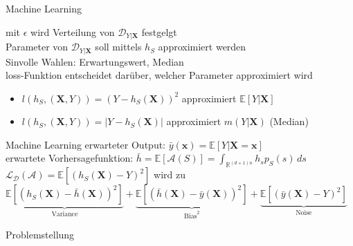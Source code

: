 \documentclass[17pt, fleqn]{beamer}
\begin{document}
\begin{frame}{Machine Learning}
    \small{
        mit $ \epsilon $ wird Verteilung von $ \mathcal{D}_{Y|\mathbf{X}} $ festgelgt \\ [0.2cm]
        Parameter von $ \mathcal{D}_{Y|\mathbf{X}} $ soll mittels $ h_S $ approximiert werden \\ [0.2cm]
        Sinvolle Wahlen: Erwartungswert, Median \\ [0.2cm]
        loss-Funktion entscheidet darüber, welcher Parameter approximiert wird
        \begin{itemize}
            \item $l(h_S, (\mathbf{X}, Y)) = (Y - h_S(\mathbf{X}))^2 $ approximiert $\mathbb{E}[Y|\mathbf{X}] $
            \item $l(h_S, (\mathbf{X}, Y)) = |Y- h_S(\mathbf{X})| $ approximiert $m(Y|\mathbf{X}) $ (Median) 
        \end{itemize}
    }
\end{frame}

\begin{frame}{Machine Learning}
    \small{
        erwarteter Output: $ \bar{y}(\mathbf{x}) = \mathbb{E}[Y|\mathbf{X} = \mathbf{x}] $ \\[0.5cm]
        erwartete Vorhersagefunktion: $ \bar{h} = \mathbb{E}[\mathcal{A}(S)] = \int_{\mathbb{R}^{(d+1)n}} h_s p_S(s)  \,ds $ \\[0.5cm]
        $ \mathcal{L}_{\mathcal{D}}(\mathcal{A}) = \mathbb{E}[(h_S(\mathbf{\mathbf{X}})-Y)^2] $ wird zu \\[0.5cm]
        \footnotesize{$ \underbrace{\mathbb{E}[(h_S(\mathbf{X})- \bar{h}(\mathbf{X}))^2]}_{\text{Variance}}+\underbrace{\mathbb{E}[(\bar{h}(\mathbf{X})-\bar{y}(\mathbf{X}))^2]}_{\text{Bias}^2} + \underbrace{\mathbb{E}[(\bar{y}(\mathbf{X})-Y)^2]}_{\text{Noise}} $
    }}
    
\end{frame}


\begin{frame}{Problemstellung}
    \begin{tiny}
	\end{tiny}
    
\end{frame}
\end{document}
